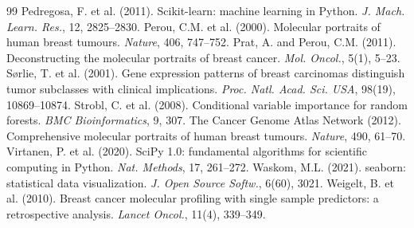 \documentclass[10pt,twocolumn]{article}
\begin{document}
\begin{thebibliography}{99}
 Pedregosa, F. et al. (2011). Scikit-learn: machine learning in Python. \textit{J. Mach. Learn. Res.}, 12, 2825--2830.
 Perou, C.M. et al. (2000). Molecular portraits of human breast tumours. \textit{Nature}, 406, 747--752.
 Prat, A. and Perou, C.M. (2011). Deconstructing the molecular portraits of breast cancer. \textit{Mol. Oncol.}, 5(1), 5--23.
 S{\o}rlie, T. et al. (2001). Gene expression patterns of breast carcinomas distinguish tumor subclasses with clinical implications. \textit{Proc. Natl. Acad. Sci. USA}, 98(19), 10869--10874.
 Strobl, C. et al. (2008). Conditional variable importance for random forests. \textit{BMC Bioinformatics}, 9, 307.
 The Cancer Genome Atlas Network (2012). Comprehensive molecular portraits of human breast tumours. \textit{Nature}, 490, 61--70.
 Virtanen, P. et al. (2020). SciPy 1.0: fundamental algorithms for scientific computing in Python. \textit{Nat. Methods}, 17, 261--272.
 Waskom, M.L. (2021). seaborn: statistical data visualization. \textit{J. Open Source Softw.}, 6(60), 3021.
 Weigelt, B. et al. (2010). Breast cancer molecular profiling with single sample predictors: a retrospective analysis. \textit{Lancet Oncol.}, 11(4), 339--349.
\end{thebibliography}
\end{document}
